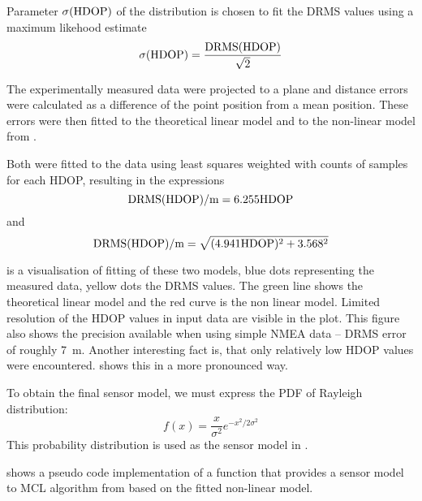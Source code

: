 Parameter \(\sigma(\mathrm{HDOP})\) of the distribution is chosen to fit the DRMS values using a maximum likehood estimate
\begin{equation}
	\sigma(\mathrm{HDOP}) = \frac{\mathrm{DRMS}(\mathrm{HDOP})}{\sqrt{2}}
\end{equation}

The experimentally measured data were projected to a plane and distance errors
were calculated as a difference of the point position from a mean position.
These errors were then fitted to the theoretical linear model and to
the non-linear model from \cite{www-wilson}.

Both were fitted to the data using least squares weighted with counts of samples
for each HDOP, resulting in the expressions
\begin{equation}
\mathrm{DRMS}(\mathrm{HDOP}) / \si{\meter} = \num{6.255} \mathrm{HDOP}
\end{equation}
and
\begin{equation}
\mathrm{DRMS}(\mathrm{HDOP}) / \si{\meter} = \sqrt{(\num{4.941}\mathrm{HDOP})^2 + \num{3.568}^2}
\end{equation}

 is a visualisation of fitting of these two models,
blue dots representing the measured data, yellow dots the DRMS values.
The green line shows the theoretical linear model and the red curve is the non linear model.
Limited resolution of the HDOP values in input data are visible in the plot.
This figure also shows the precision available when using simple NMEA data --
DRMS error of roughly \SI{7}{\meter}.
Another interesting fact is, that only relatively low HDOP values were encountered.
 shows this in a more pronounced way.

To obtain the final sensor model, we must express the PDF of Rayleigh distribution:
\begin{equation}
    f(x) = \frac{x}{\sigma^2}e^{-x^2/2\sigma^2}
\end{equation}
This probability distribution is used as the sensor model in .

 shows a pseudo code implementation of a function
that provides a sensor model to MCL algorithm from  based on the
fitted non-linear model.


